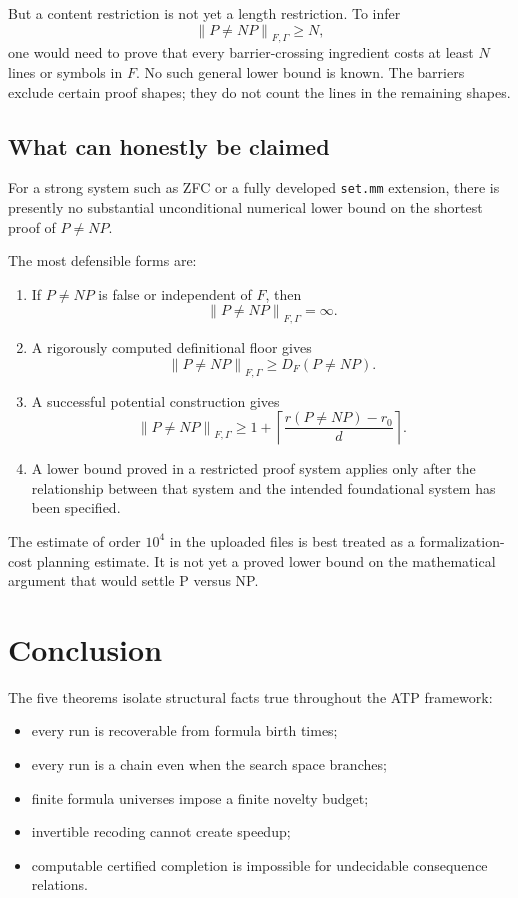 \documentclass[11pt,letterpaper]{article}
\theoremstyle{named}
\newcommand{\prooflen}[2]{\left\lVert #1\right\rVert_{#2}}
\begin{document}
But a content restriction is not yet a length restriction. To infer
\[
\prooflen{P\ne NP}{F,\Gamma}\ge N,
\]
one would need to prove that every barrier-crossing ingredient costs at least $N$ lines or symbols in $F$. No such general lower bound is known. The barriers exclude certain proof shapes; they do not count the lines in the remaining shapes.

\subsection{What can honestly be claimed}

For a strong system such as ZFC or a fully developed \texttt{set.mm} extension, there is presently no substantial unconditional numerical lower bound on the shortest proof of $P\ne NP$.

The most defensible forms are:

\begin{enumerate}
\item If $P\ne NP$ is false or independent of $F$, then
\[
\prooflen{P\ne NP}{F,\Gamma}=\infty.
\]

\item A rigorously computed definitional floor gives
\[
\prooflen{P\ne NP}{F,\Gamma}
\ge
D_F(P\ne NP).
\]

\item A successful potential construction gives
\[
\prooflen{P\ne NP}{F,\Gamma}
\ge
1+
\left\lceil
\frac{r(P\ne NP)-r_0}{d}
\right\rceil.
\]

\item A lower bound proved in a restricted proof system applies only after the relationship between that system and the intended foundational system has been specified.
\end{enumerate}

The estimate of order $10^4$ in the uploaded files is best treated as a formalization-cost planning estimate. It is not yet a proved lower bound on the mathematical argument that would settle P versus NP.

\section{Conclusion}

The five theorems isolate structural facts true throughout the ATP framework:

\begin{itemize}
\item every run is recoverable from formula birth times;
\item every run is a chain even when the search space branches;
\item finite formula universes impose a finite novelty budget;
\item invertible recoding cannot create speedup;
\item computable certified completion is impossible for undecidable consequence relations.
\end{itemize}
\end{document}
